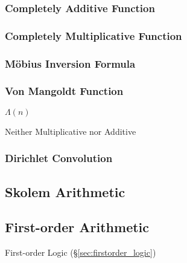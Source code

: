 \subsubsection{Completely Additive Function}
\label{sec:completely_additive_function}

\subsubsection{Completely Multiplicative Function}
\label{sec:completely_multiplicative_function}

\subsubsection{M\"obius Inversion Formula}
\label{sec:mobius_inversion}

\subsubsection{Von Mangoldt Function}\label{sec:vonmangoldt_function}

$\Lambda(n)$

Neither Multiplicative nor Additive



\subsubsection{Dirichlet Convolution}\label{sec:dirichlet_convolution}



\subsection{Skolem Arithmetic}\label{sec:skolem_arithmetic}
\cite{skolem23}

\subsection{First-order Arithmetic}\label{sec:firstorder_arithmetic}

First-order Logic (\S\ref{sec:firstorder_logic})



